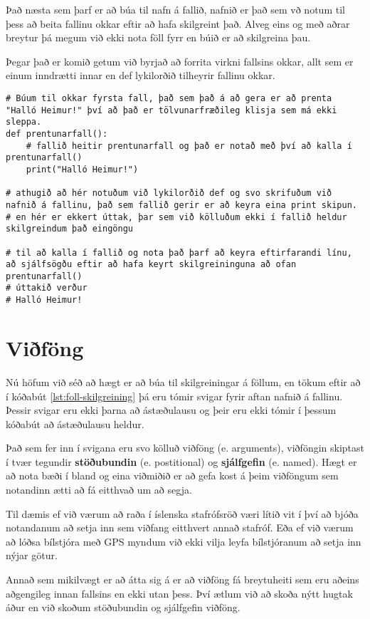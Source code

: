 Það næsta sem þarf er að búa til nafn á fallið, nafnið er það sem vð notum til þess að beita fallinu okkar eftir að hafa skilgreint það.
Alveg eins og með aðrar breytur þá megum við ekki nota föll fyrr en búið er að skilgreina þau.

Þegar það er komið getum við byrjað að forrita virkni fallsins okkar, allt sem er einum inndrætti innar en def lykilorðið tilheyrir fallinu okkar.


\begin{lstlisting}[caption=Föll skilgreind, label=lst:foll-skilgreining]
# Búum til okkar fyrsta fall, það sem það á að gera er að prenta "Halló Heimur!" því að það er tölvunarfræðileg klisja sem má ekki sleppa.
def prentunarfall():
	# fallið heitir prentunarfall og það er notað með því að kalla í prentunarfall()
	print("Halló Heimur!")
	
# athugið að hér notuðum við lykilorðið def og svo skrifuðum við nafnið á fallinu, það sem fallið gerir er að keyra eina print skipun.
# en hér er ekkert úttak, þar sem við kölluðum ekki í fallið heldur skilgreindum það eingöngu

# til að kalla í fallið og nota það þarf að keyra eftirfarandi línu, að sjálfsögðu eftir að hafa keyrt skilgreininguna að ofan
prentunarfall()
# úttakið verður
# Halló Heimur!
\end{lstlisting}

\section{Viðföng}
Nú höfum við séð að hægt er að búa til skilgreiningar á föllum, en tökum eftir að í kóðabút \ref{lst:foll-skilgreining} þá eru tómir svigar fyrir aftan nafnið á fallinu.
Þessir svigar eru ekki þarna að ástæðulausu og þeir eru ekki tómir í þessum kóðabút að ástæðulausu heldur.

Það sem fer inn í svigana eru svo kölluð viðföng (e. arguments), viðföngin skiptast í tvær tegundir \textbf{stöðubundin} (e. postitional) og \textbf{sjálfgefin} (e. named).
Hægt er að nota bæði í bland og eina viðmiðið er að gefa kost á þeim viðföngum sem notandinn ætti að fá eitthvað um að segja.

Til dæmis ef við værum að raða í íslenska stafrófsröð væri lítið vit í því að bjóða notandanum að setja inn sem viðfang eitthvert annað stafróf.
Eða ef við værum að lóðsa bílstjóra með GPS myndum við ekki vilja leyfa bílstjóranum að setja inn nýjar götur.

Annað sem mikilvægt er að átta sig á er að viðföng fá breytuheiti sem eru aðeins aðgengileg innan fallsins en ekki utan þess. Því ætlum við að skoða nýtt hugtak áður en við skoðum stöðubundin og sjálfgefin viðföng.

